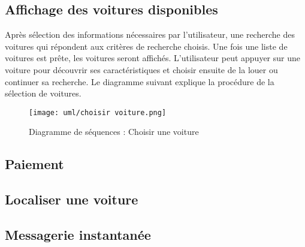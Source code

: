 \subsection{Affichage des voitures disponibles}
Après sélection des informations nécessaires par l'utilisateur, une recherche des voitures qui répondent aux critères de recherche choisis. Une fois une liste de voitures est prête, les voitures seront affichés. L'utilisateur peut appuyer sur une voiture pour découvrir ses caractéristiques et choisir ensuite de la louer ou continuer sa recherche.
Le diagramme suivant explique la procédure de la sélection de voitures.
\vspace{1cm}
\begin{figure}[H]
    \centering
    \texttt{[image: uml/choisir voiture.png]}
    \vspace{1cm}
    \caption{Diagramme de séquences : Choisir une voiture}
    \label{fig:seq_car_select}
\end{figure}
\subsection{Paiement}
\subsection{Localiser une voiture}
\subsection{Messagerie instantanée}